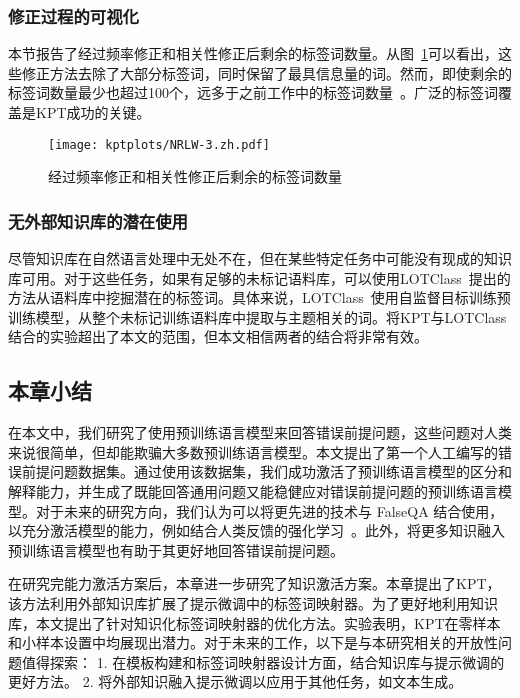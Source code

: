 \subsubsection{修正过程的可视化}
\label{app:remainwords}
本节报告了经过频率修正和相关性修正后剩余的标签词数量。从图~\ref{fig:remainwords}可以看出，这些修正方法去除了大部分标签词，同时保留了最具信息量的词。然而，即使剩余的标签词数量最少也超过100个，远多于之前工作中的标签词数量~\cite{schick2020automatically}。广泛的标签词覆盖是KPT成功的关键。

\begin{figure}[!htbp]
    \centering
    \texttt{[image: kptplots/NRLW-3.zh.pdf]}
    \caption{经过频率修正和相关性修正后剩余的标签词数量}
    \label{fig:remainwords}
\end{figure}

\subsubsection{无外部知识库的潜在使用}
\label{withoutkb}
尽管知识库在自然语言处理中无处不在，但在某些特定任务中可能没有现成的知识库可用。对于这些任务，如果有足够的未标记语料库，可以使用LOTClass~\cite{meng2020text}提出的方法从语料库中挖掘潜在的标签词。具体来说，LOTClass~\cite{meng2020text}使用自监督目标训练预训练模型，从整个未标记训练语料库中提取与主题相关的词。将KPT与LOTClass结合的实验超出了本文的范围，但本文相信两者的结合将非常有效。

\subsection{本章小结}


在本文中，我们研究了使用预训练语言模型来回答错误前提问题，这些问题对人类来说很简单，但却能欺骗大多数预训练语言模型。本文提出了第一个人工编写的错误前提问题数据集。通过使用该数据集，我们成功激活了预训练语言模型的区分和解释能力，并生成了既能回答通用问题又能稳健应对错误前提问题的预训练语言模型。对于未来的研究方向，我们认为可以将更先进的技术与 FalseQA 结合使用，以充分激活模型的能力，例如结合人类反馈的强化学习~\cite{ouyang2022training}。此外，将更多知识融入预训练语言模型也有助于其更好地回答错误前提问题。

在研究完能力激活方案后，本章进一步研究了知识激活方案。本章提出了KPT，该方法利用外部知识库扩展了提示微调中的标签词映射器。为了更好地利用知识库，本文提出了针对知识化标签词映射器的优化方法。实验表明，KPT在零样本和小样本设置中均展现出潜力。对于未来的工作，以下是与本研究相关的开放性问题值得探索：
1. 在模板构建和标签词映射器设计方面，结合知识库与提示微调的更好方法。
2. 将外部知识融入提示微调以应用于其他任务，如文本生成。

